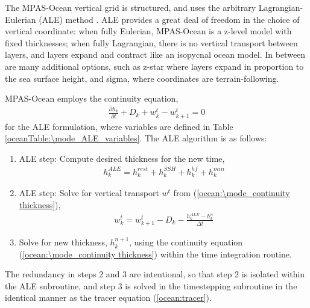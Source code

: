 The MPAS-Ocean vertical grid is structured, and uses the arbitrary Lagrangian-Eulerian (ALE) method \citet{Petersen_ea14om}.   ALE provides a great deal of freedom in the choice of vertical coordinate: when fully Eulerian, MPAS-Ocean is a z-level model with fixed thicknesses; when fully Lagrangian, there is no vertical transport between layers, and layers expand and contract like an isopycnal ocean model.  In between are many additional options, such as z-star where layers expand in proportion to the sea surface height, and sigma, where coordinates are terrain-following.

MPAS-Ocean employs the continuity equation,
\begin{eqnarray}
\label{ocean:\mode_continuity thickness}
\frac{\partial h_{k}}{\partial t} + D_k + w^t_k - w^t_{k+1} =0
\end{eqnarray}
for the ALE formulation, where variables are defined in Table \ref{oceanTable:\mode_ALE_variables}.  The ALE algorithm is as follows:
\begin{enumerate}
\item ALE step: Compute desired thickness for the new time,
\begin{eqnarray}
\label{ocean:\mode_desired thickness}
h_k^{ALE} = h_k^{rest} + h_k^{SSH} + h_k^{hf} + h_k^{min}
\end{eqnarray}
\item ALE step: Solve for vertical transport $w^t$ from (\ref{ocean:\mode_continuity thickness}),
\begin{eqnarray}
\label{ocean:\mode vert tranport}
w^t_k = w^t_{k+1} - D_k - \frac{h^{ALE}_k - h^n_k}{\Delta t}
\end{eqnarray}
\item Solve for new thickness, $h_{k}^{n+1}$, using the continuity equation (\ref{ocean:\mode_continuity thickness}) within the time integration routine.
\end{enumerate}
The redundancy in steps 2 and 3 are intentional, so that step 2 is isolated within the ALE subroutine, and step 3 is solved in the timestepping subroutine in the identical manner as the tracer equation (\ref{ocean:tracer}).

